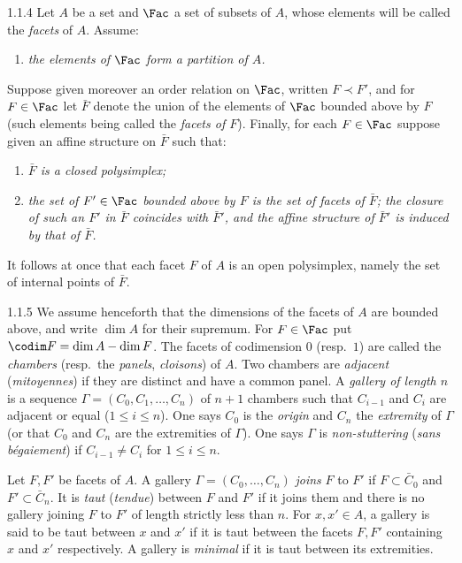 \documentclass[12pt,a4paper,oneside,english]{smfart}
\makeatletter
\newcommand{\btanchor}[1]{\leavevmode\Hy@raisedlink{\hypertarget{bt:#1}{}}}
\theoremstyle{definition}
\theoremstyle{bt}
\makeatother
\begin{document}
\num{1.1.4}\btanchor{1.1.4} Let $A$ be a set and $\Fac$ a set of subsets of $A$, whose
elements will be called the \emph{facets} of $A$. Assume:
\begin{enumerate}[label=(\arabic*),leftmargin=2.4em]
\item \emph{the elements of $\Fac$ form a partition of $A$.}
\end{enumerate}
Suppose given moreover an order relation on $\Fac$, written $F\prec F'$, and for $F\in\Fac$ let $\bar F$ denote the union of the elements of $\Fac$ bounded above by $F$ (such elements being called the \emph{facets of $F$}). Finally, for each $F\in\Fac$ suppose given an affine structure on $\bar F$ such that:
\begin{enumerate}[label=(\arabic*),leftmargin=2.4em,start=2]
\item \emph{$\bar F$ is a closed polysimplex;}
\item \emph{the set of $F'\in\Fac$ bounded above by $F$ is the set of facets
  of $\bar F$; the closure of such an $F'$ in $\bar F$ coincides with   $\bar F'$, and the affine structure of $\bar F'$ is induced by that of   $\bar F$.}
\end{enumerate}
It follows at once that each facet $F$ of $A$ is an open polysimplex, namely the set of internal points of $\bar F$.

\num{1.1.5}\btanchor{1.1.5} We assume henceforth that the dimensions of the facets of $A$ are
bounded above, and write $\dim A$ for their supremum. For $F\in\Fac$ put $\codim F=\dim A-\dim F$. The facets of codimension $0$ (resp.\ $1$) are called the \emph{chambers} (resp.\ the \emph{panels}, \emph{cloisons}) of $A$. Two chambers are \emph{adjacent} (\emph{mitoyennes}) if they are distinct and have a common panel. A \emph{gallery of length $n$} is a sequence $\Gamma=(C_0,C_1,\dots,C_n)$ of $n+1$ chambers such that $C_{i-1}$ and $C_i$ are adjacent or equal ($1\leqslant i\leqslant n$). One says $C_0$ is the
\emph{origin} and $C_n$ the \emph{extremity} of $\Gamma$ (or that $C_0$ and
$C_n$ are the extremities of $\Gamma$). One says $\Gamma$ is
\emph{non-stuttering} (\emph{sans b\'egaiement}) if $C_{i-1}\neq C_i$ for
$1\leqslant i\leqslant n$.

Let $F,F'$ be facets of $A$. A gallery $\Gamma=(C_0,\dots,C_n)$ \emph{joins} $F$ to $F'$ if $F\subset\bar C_0$ and $F'\subset\bar C_n$. It is \emph{taut} (\emph{tendue}) between $F$ and $F'$ if it joins them and there is no gallery joining $F$ to $F'$ of length strictly less than $n$. For $x,x'\in A$, a gallery is said to be taut between $x$ and $x'$ if it is taut between the facets $F,F'$ containing $x$ and $x'$ respectively. A gallery is
\emph{minimal} if it is taut between its extremities.
\end{document}
